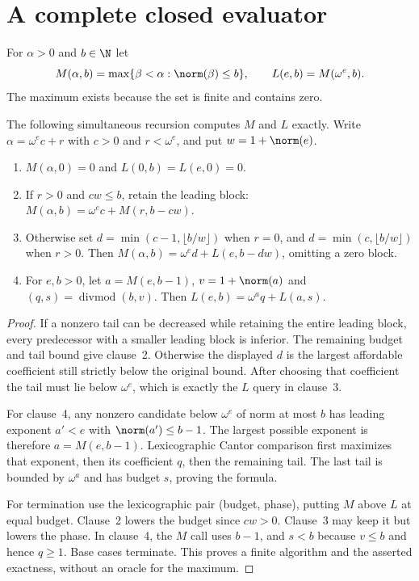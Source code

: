 \section{A complete closed evaluator}\label{sec:evaluator}

\begin{definition}\label{def:maximum}
For $\alpha>0$ and $b\in\N$ let
\[
 M(\alpha,b)=\max\{\beta<\alpha:\norm(\beta)\le b\},\qquad
 L(e,b)=M(\omega^e,b).
\]
The maximum exists because the set is finite and contains zero.
\end{definition}

\begin{theorem}\label{thm:maximum}
The following simultaneous recursion computes $M$ and $L$ exactly.
Write $\alpha=\omega^e c+r$ with $c>0$ and $r<\omega^e$, and put
$w=1+\norm(e)$.
\begin{enumerate}
\item $M(\alpha,0)=0$ and $L(0,b)=L(e,0)=0$.
\item If $r>0$ and $cw\le b$, retain the leading block:
 $M(\alpha,b)=\omega^e c+M(r,b-cw)$.
\item Otherwise set $d=\min(c-1,\lfloor b/w\rfloor)$ when $r=0$,
 and $d=\min(c,\lfloor b/w\rfloor)$ when $r>0$.  Then
 $M(\alpha,b)=\omega^e d+L(e,b-dw)$, omitting a zero block.
\item For $e,b>0$, let $a=M(e,b-1)$, $v=1+\norm(a)$ and
 $(q,s)=\operatorname{divmod}(b,v)$.  Then
 $L(e,b)=\omega^a q+L(a,s)$.
\end{enumerate}
\end{theorem}
\begin{proof}
If a nonzero tail can be decreased while retaining the entire leading block,
every predecessor with a smaller leading block is inferior.  The remaining
budget and tail bound give clause~2.  Otherwise the displayed $d$ is the
largest affordable coefficient still strictly below the original bound.
After choosing that coefficient the tail must lie below $\omega^e$, which
is exactly the $L$ query in clause~3.

For clause~4, any nonzero candidate below $\omega^e$ of norm at most $b$
has leading exponent $a'<e$ with $\norm(a')\le b-1$.  The largest possible
exponent is therefore $a=M(e,b-1)$.  Lexicographic Cantor comparison first
maximizes that exponent, then its coefficient $q$, then the remaining tail.
The last tail is bounded by $\omega^a$ and has budget $s$, proving the formula.

For termination use the lexicographic pair (budget, phase), putting $M$
above $L$ at equal budget.  Clause~2 lowers the budget since $cw>0$.
Clause~3 may keep it but lowers the phase.  In clause~4, the $M$ call uses
$b-1$, and $s<b$ because $v\le b$ and hence $q\ge1$.  Base cases terminate.
This proves a finite algorithm and the asserted exactness, without an oracle
for the maximum.
\end{proof}

